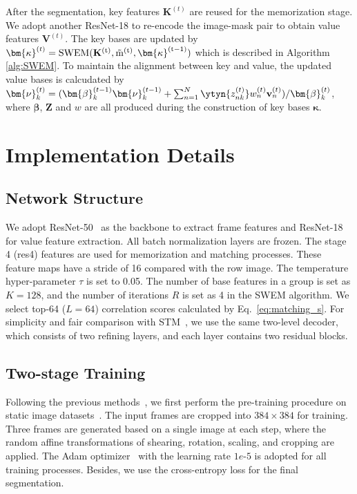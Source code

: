 After the segmentation, key features $\mathbf{K}^{(t)}$ are reused for the memorization stage. We adopt another ResNet-18 to re-encode the image-mask pair to obtain value features $\mathbf{V}^{(t)}$. The key bases are updated by $\bm{\kappa}^{(t)}=\rm{SWEM}(\mathbf{K}^{(t)}, \tilde{m}^{(t)}, \bm{\kappa}^{(t-1)})$ which is described in Algorithm \ref{alg:SWEM}. To maintain the alignment between key and value, the updated value bases is calcudated by $\bm{\nu}^{(t)}_k = (\bm{\beta}^{(t-1)}_k \bm{\nu}^{(t-1)}_k + \sum_{n=1}^{N}\ytyn{{z}^{(t)}_{nk}}w^{(t)}_n\mathbf{v}^{(t)}_n)/\bm{\beta}^{(t)}_k$, where $\bm{\beta}$, $\mathbf{Z}$ and $w$ are all produced during the construction of key bases $\bm{\kappa}$.

\section{Implementation Details}

\subsection{Network Structure}
\label{subsec:network}
We adopt ResNet-50~\cite{he2016deep} as the backbone to extract frame features and ResNet-18 for value feature extraction. All batch normalization layers are frozen. The stage 4 (res4) features are used for memorization and matching processes. These feature maps have a stride of 16 compared with the row image. The temperature hyper-parameter $\tau$ is set to 0.05. The number of base features in a group is set as $K=128$, and the number of iterations $R$ is set as 4 in the SWEM algorithm. We select top-64 ($L=64$) correlation scores calculated by Eq.~\eqref{eq:matching_s}. For simplicity and fair comparison with STM~\cite{Oh_2019_ICCV}, we use the same two-level decoder, which consists of two refining layers, and each layer contains two residual blocks. 

\subsection{Two-stage Training}
Following the previous methods~\cite{Wang_2019_ICCV,Oh_2019_ICCV,seong_2020_ECCV,lu_2020_ECCV,liang2020video}, we first perform the pre-training procedure on static image datasets~\cite{cocolin2014microsoft,msra10kChengPAMI,ecssdshi2015hierarchical,pascalsli2014secrets,pascolvoceveringham2010pascal}. The input frames are cropped into $384\times 384$ for training. Three frames are generated based on a single image at each step, where the random affine transformations of shearing, rotation, scaling, and cropping are applied. The Adam optimizer~\cite{kingma2014adam} with the learning rate $1e$-$5$ is adopted for all training processes. Besides, we use the cross-entropy loss for the final segmentation.

